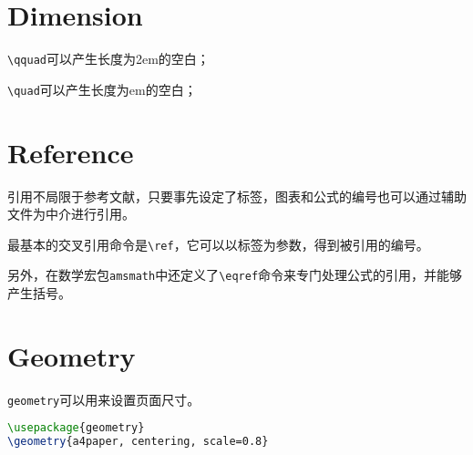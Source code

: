 \chapter{Dimension}

\begin{compactitem}
\item \texttt{\textbackslash qquad}可以产生长度为2em的空白；
\item \texttt{\textbackslash quad}可以产生长度为em的空白；
\end{compactitem}

\chapter{Reference}

引用不局限于参考文献，只要事先设定了标签，图表和公式的编号也可以通过辅助文件为中介进行引用。

最基本的交叉引用命令是\texttt{\textbackslash ref}，它可以以标签为参数，得到被引用的编号。

另外，在数学宏包\texttt{amsmath}中还定义了\texttt{\textbackslash eqref}命令来专门处理公式的引用，并能够产生括号。

\chapter{Geometry}

\texttt{geometry}可以用来设置页面尺寸。



\begin{lstlisting}[language=TeX]
\usepackage{geometry}
\geometry{a4paper, centering, scale=0.8}
\end{lstlisting}




\begin{lstlisting}[language=TeX]

\end{lstlisting}




\begin{lstlisting}[language=TeX]

\end{lstlisting}



\begin{lstlisting}[language=TeX]

\end{lstlisting}



